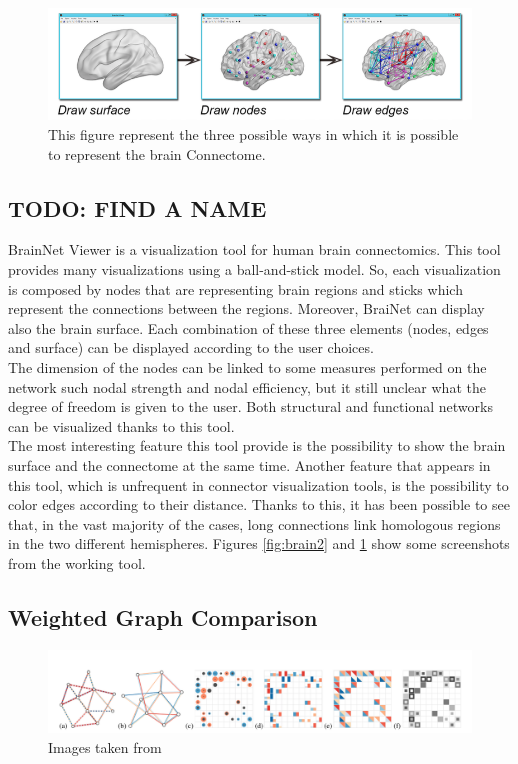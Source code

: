 \documentclass{article}
\begin{document}
\begin{multicols}{2}
\begin{figure}[ht]
\centerline{\includegraphics[width=1.9\columnwidth]{brain1}}
\caption{This figure represent the three possible ways in which it is possible to represent the brain Connectome.}
    \label{fig:brain1}
\end{figure}


\subsection{TODO: FIND A NAME}
BrainNet Viewer \cite{brainNetViewer} is a visualization tool for human brain connectomics. This tool provides many visualizations using a ball-and-stick model. So, each visualization is composed by nodes that are representing brain regions and sticks which represent the connections between the regions. Moreover, BraiNet can display also the brain surface. Each combination of these three elements (nodes, edges and surface) can be displayed according to the user choices.\\
The dimension of the nodes can be linked to some measures performed on the network such nodal strength and nodal efficiency, but it still unclear what the degree of freedom is given to the user. Both structural and functional networks can be visualized thanks to this tool.\\
The most interesting feature this tool provide is the possibility to show the brain surface and the connectome at the same time. Another feature that appears in this tool, which is unfrequent in connector visualization tools, is the possibility to color edges according to their distance. Thanks to this, it has been possible to see that, in the vast majority of the cases, long connections link homologous regions in the two different hemispheres. Figures \ref{fig:brain2} and \ref{fig:brain1} show some screenshots from the working tool.




\subsection{Weighted Graph Comparison}
\begin{figure}[ht]
\centering
\includegraphics[width = 1.8\columnwidth]{weightedGraphs}
\caption{Images taken from \cite{weightedGraphComparison}}
\label{fig:weightedGraph}
\end{figure}


\end{multicols}
\end{document}
